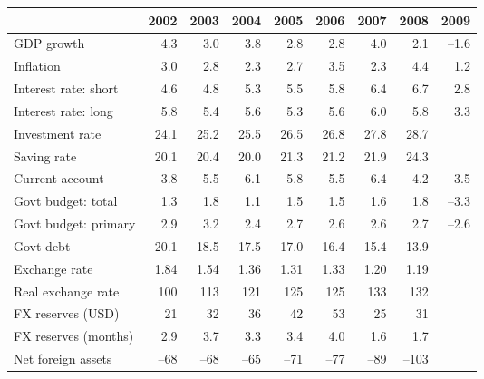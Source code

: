 \documentclass[letterpaper,12pt]{exam}
\begin{document}
\begin{questions}
\begin{solution}
\begin{parts}
\end{parts}
\end{solution}

%
\begin{center}
{\small
\begin{tabular}{lrrrrrrrr}%
\toprule
    & 2002 & 2003 & 2004 & 2005 & 2006 &  2007 &  2008 & 2009 \\%
\midrule
GDP growth  & 4.3 & 3.0 & 3.8 & 2.8 & 2.8 & 4.0 & 2.1
        & --1.6 \\
Inflation
        & 3.0 & 2.8 & 2.3 & 2.7 & 3.5 & 2.3 & 4.4 & 1.2 \\
Interest rate:  short
        & 4.6 & 4.8 & 5.3 & 5.5 & 5.8 & 6.4 & 6.7 & 2.8 \\
Interest rate:  long
        & 5.8 & 5.4 & 5.6 & 5.3 & 5.6 & 6.0 & 5.8 & 3.3 \\
Investment rate
        & 24.1 & 25.2 & 25.5 & 26.5 & 26.8 & 27.8 & 28.7 &  \\
Saving rate
        & 20.1 & 20.4 & 20.0 & 21.3 & 21.2 & 21.9 & 24.3 &  \\
Current account
        & --3.8 & --5.5 & --6.1 & --5.8 & --5.5
        & --6.4 & --4.2 & --3.5 \\
Govt budget:  total
        & 1.3 & 1.8 & 1.1 & 1.5 & 1.5 & 1.6 & 1.8 & --3.3 \\
Govt budget:  primary
        & 2.9 & 3.2 & 2.4 & 2.7 & 2.6 & 2.6 & 2.7 & --2.6 \\
Govt debt
        & 20.1 & 18.5 & 17.5 & 17.0 & 16.4 & 15.4 & 13.9  \\
Exchange rate
        & 1.84 & 1.54 & 1.36 & 1.31 & 1.33 & 1.20 & 1.19 \\
Real exchange rate
        & 100 &  113 & 121 & 125 & 125 & 133 & 132 \\
FX reserves (USD)
        & 21 & 32 & 36 & 42 & 53 & 25 & 31 & \\
FX reserves (months)
        &  2.9 & 3.7 & 3.3 & 3.4 & 4.0 & 1.6 & 1.7 \\
Net foreign assets
        & --68 & --68 & --65 & --71 & --77 & --89 & --103 \\
\bottomrule
\end{tabular}
}
\end{center}
\end{questions}
\end{document}
